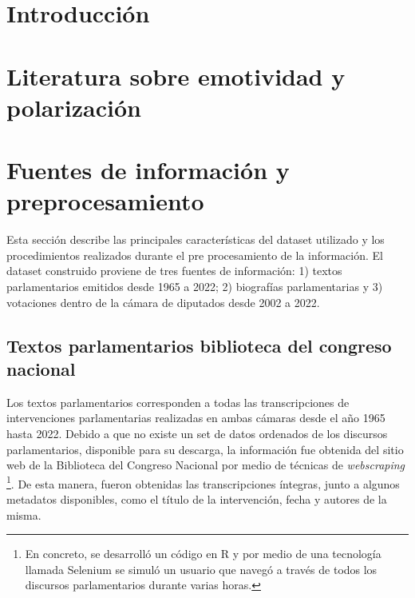 \documentclass[
  12pt,
]{article}
\author{}
\date{\vspace{-2.5em}}
\begin{document}
\newpage
\begin{spacing}{0.9} 
\tableofcontents
\end{spacing}

\newpage

\begin{spacing}{0.9} 
\listoftables
\end{spacing}

\newpage
\listoffigures
\newpage
\normalsize

\hypertarget{introducciuxf3n}{%
\section{Introducción}\label{introducciuxf3n}}

\hypertarget{literatura-sobre-emotividad-y-polarizaciuxf3n}{%
\section{Literatura sobre emotividad y
polarización}\label{literatura-sobre-emotividad-y-polarizaciuxf3n}}

\hypertarget{fuentes-de-informaciuxf3n-y-preprocesamiento}{%
\section{Fuentes de información y
preprocesamiento}\label{fuentes-de-informaciuxf3n-y-preprocesamiento}}

Esta sección describe las principales características del dataset
utilizado y los procedimientos realizados durante el pre procesamiento
de la información. El dataset construido proviene de tres fuentes de
información: 1) textos parlamentarios emitidos desde 1965 a 2022; 2)
biografías parlamentarias y 3) votaciones dentro de la cámara de
diputados desde 2002 a 2022.

\hypertarget{textos-parlamentarios-biblioteca-del-congreso-nacional}{%
\subsection{Textos parlamentarios biblioteca del congreso
nacional}\label{textos-parlamentarios-biblioteca-del-congreso-nacional}}

Los textos parlamentarios corresponden a todas las transcripciones de
intervenciones parlamentarias realizadas en ambas cámaras desde el año
1965 hasta 2022. Debido a que no existe un set de datos ordenados de los
discursos parlamentarios, disponible para su descarga, la información
fue obtenida del sitio web de la Biblioteca del Congreso Nacional por
medio de técnicas de \emph{webscraping}
\footnote{En concreto, se desarrolló un código en R y por medio de una tecnología llamada Selenium se simuló un usuario que navegó a través de todos los discursos parlamentarios durante varias horas.}.
De esta manera, fueron obtenidas las transcripciones íntegras, junto a
algunos metadatos disponibles, como el título de la intervención, fecha
y autores de la misma.
\end{document}
